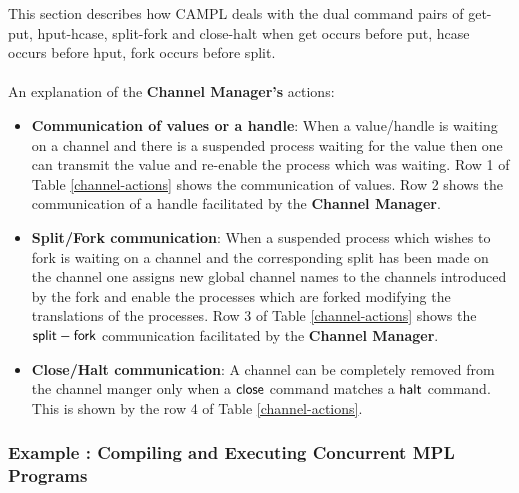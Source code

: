 \documentclass[11pt]{article}
\newcommand{\<}{\langle}
\renewcommand{\>}{\rangle}
\begin{document}
This section describes how CAMPL deals with the dual command pairs of {\sf get-put}, {\sf hput-hcase}, {\sf split-fork} and {\sf close-halt} when {\sf get} occurs before {\sf put}, 
{\sf hcase} occurs before {\sf hput}, {\sf fork} occurs before {\sf split}.
~~\\~~\\
An explanation of the {\bf Channel Manager's} actions:
\begin{itemize}
  \item {\bf Communication of values or a handle}:
When a value/handle is waiting on a channel and there is a suspended process waiting for the value then one can transmit the value and re-enable the process which was waiting. Row 1 of Table \ref {channel-actions} shows the communication of {\sf values}. Row 2 shows the communication of a {\sf handle} facilitated by the {\bf Channel Manager}.

\item {\bf Split/Fork communication}:
When a suspended process which wishes to fork is waiting on a channel and the corresponding split has been made on the channel one assigns new global channel names to the channels introduced by the fork and enable the processes which are forked modifying the translations of the processes. Row 3 of Table \ref {channel-actions} shows the ${\sf split-fork}$ communication facilitated by the {\bf Channel Manager}.

\item {\bf Close/Halt communication}:
A channel can be completely removed from the channel manger only when a ${\sf close}$ command matches a ${\sf halt}$ command. This is shown by the row 4 of Table \ref {channel-actions}.

\end{itemize}

\subsubsection {Example : Compiling and Executing Concurrent MPL Programs}
\end{document}
